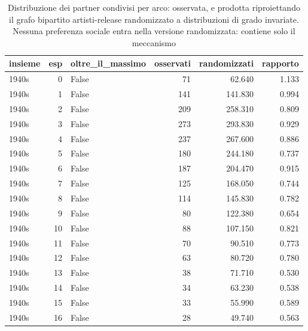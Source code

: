 \begin{table}
\centering
\caption{Distribuzione dei partner condivisi per arco: osservata, e prodotta riproiettando il grafo bipartito artisti-release randomizzato a distribuzioni di grado invariate. Nessuna preferenza sociale entra nella versione randomizzata: contiene solo il meccanismo}
\label{tab:t4_proiezione_nulla}
\begin{tabular}{lrlrrr}
\toprule
    insieme &  esp &  oltre\_il\_massimo &  osservati &  randomizzati &  rapporto \\
\midrule
      1940s &    0 &             False &         71 &        62.640 &     1.133 \\
      1940s &    1 &             False &        141 &       141.830 &     0.994 \\
      1940s &    2 &             False &        209 &       258.310 &     0.809 \\
      1940s &    3 &             False &        273 &       293.830 &     0.929 \\
      1940s &    4 &             False &        237 &       267.600 &     0.886 \\
      1940s &    5 &             False &        180 &       244.180 &     0.737 \\
      1940s &    6 &             False &        187 &       204.470 &     0.915 \\
      1940s &    7 &             False &        125 &       168.050 &     0.744 \\
      1940s &    8 &             False &        114 &       145.830 &     0.782 \\
      1940s &    9 &             False &         80 &       122.380 &     0.654 \\
      1940s &   10 &             False &         88 &       107.150 &     0.821 \\
      1940s &   11 &             False &         70 &        90.510 &     0.773 \\
      1940s &   12 &             False &         63 &        80.720 &     0.780 \\
      1940s &   13 &             False &         38 &        71.710 &     0.530 \\
      1940s &   14 &             False &         34 &        63.230 &     0.538 \\
      1940s &   15 &             False &         33 &        55.990 &     0.589 \\
      1940s &   16 &             False &         28 &        49.740 &     0.563 \\

\end{tabular}
\end{table}
